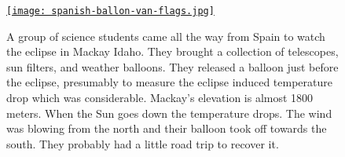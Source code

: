 
\begin{figure}[htbp]
\centering
\href{https://conceptcontrol.smugmug.com/Places/USA-and-Canada/Idaho-Instants/i-dGsRkQn/A}{\texttt{[image: spanish-ballon-van-flags.jpg]}}
\caption{A group of science students came all the way from Spain to watch the
eclipse in Mackay Idaho. They brought a collection of telescopes, sun
filters, and weather balloons. They released a balloon just before the
eclipse, presumably to measure the eclipse induced temperature drop
which was considerable. Mackay's elevation is almost 1800 meters. When
the Sun goes down the temperature drops. The wind was blowing from the
north and their balloon took off towards the south. They probably had a
little road trip to recover it.}
\label{fig:5340x4}
\end{figure}



